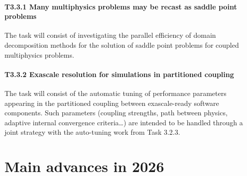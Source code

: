 \paragraph*{T3.3.1 Many multiphysics problems may be recast as saddle point problems}

 The task will
consist of investigating the parallel efficiency of domain decomposition methods for the solution of
saddle point problems for coupled multiphysics problems.

\paragraph*{T3.3.2 Exascale resolution for simulations in partitioned coupling}

 The task will consist of the
automatic tuning of performance parameters appearing in the partitioned coupling between
exascale-ready software components. Such parameters (coupling strengths, path between physics,
adaptive internal convergence criteria…) are intended to be handled through a joint strategy with the
auto-tuning work from Task 3.2.3.


\clearpage
\section{Main advances in 2026}
\label{sec:wp3-main-advances-2026}


